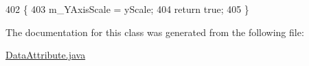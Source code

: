 \begin{DoxyCode}
402                                                 \{
403         m\_YAxisScale = yScale;
404         \textcolor{keywordflow}{return} \textcolor{keyword}{true};
405     \}
\end{DoxyCode}


The documentation for this class was generated from the following file\-:\begin{DoxyCompactItemize}
\item 
\hyperlink{_data_attribute_8java}{Data\-Attribute.\-java}\end{DoxyCompactItemize}
